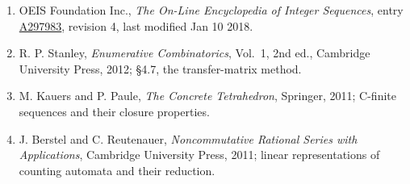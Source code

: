 \documentclass[11pt]{article}
\theoremstyle{definition}
\begin{document}
\begin{enumerate}

\item OEIS Foundation Inc., \emph{The On-Line Encyclopedia of Integer Sequences}, entry \href{https://oeis.org/A297983}{A297983}, revision 4, last modified Jan 10 2018.

\item R. P. Stanley, \emph{Enumerative Combinatorics}, Vol.~1, 2nd ed., Cambridge University Press, 2012; \S4.7, the transfer-matrix method.

\item M. Kauers and P. Paule, \emph{The Concrete Tetrahedron}, Springer, 2011; C-finite sequences and their closure properties.

\item J. Berstel and C. Reutenauer, \emph{Noncommutative Rational Series with Applications}, Cambridge University Press, 2011; linear representations of counting automata and their reduction.

\end{enumerate}
\end{document}
